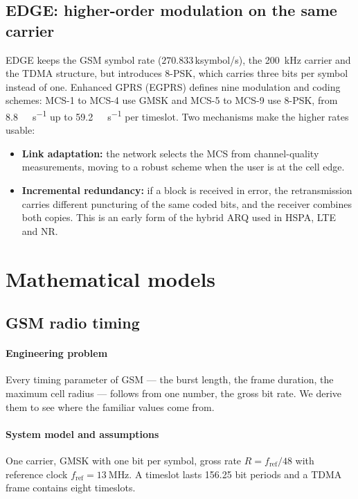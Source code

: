 \documentclass[11pt,a4paper]{article}
\begin{document}
\subsection{EDGE: higher-order modulation on the same carrier}
EDGE keeps the GSM symbol rate ($270.833$\,ksymbol/s), the \qty{200}{\kilo\hertz}
carrier and the TDMA structure, but introduces 8-PSK, which carries three bits per
symbol instead of one. Enhanced GPRS (EGPRS) defines nine modulation and coding
schemes: MCS-1 to MCS-4 use GMSK and MCS-5 to MCS-9 use 8-PSK, from
\qty{8.8}{\kilo\bit\per\second} up to \qty{59.2}{\kilo\bit\per\second} per timeslot.
Two mechanisms make the higher rates usable:
\begin{itemize}
  \item \textbf{Link adaptation:} the network selects the MCS from channel-quality
        measurements, moving to a robust scheme when the user is at the cell edge.
  \item \textbf{Incremental redundancy:} if a block is received in error, the
        retransmission carries different puncturing of the same coded bits, and
        the receiver combines both copies. This is an early form of the hybrid ARQ
        used in HSPA, LTE and NR.
\end{itemize}

\section{Mathematical models}\label{sec:models}

\subsection{GSM radio timing}\label{sec:timing}
\paragraph{Engineering problem} Every timing parameter of GSM --- the burst length,
the frame duration, the maximum cell radius --- follows from one number, the gross
bit rate. We derive them to see where the familiar values come from.

\paragraph{System model and assumptions} One carrier, GMSK with one bit per symbol,
gross rate $R = f_{\mathrm{ref}}/48$ with reference clock $f_{\mathrm{ref}} = \qty{13}{\mega\hertz}$.
A timeslot lasts 156.25 bit periods and a TDMA frame contains eight timeslots.
\end{document}
